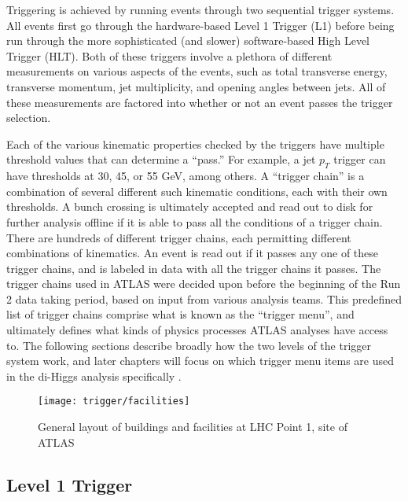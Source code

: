     Triggering is achieved by running events through two sequential trigger systems.
    All events first go through the hardware-based Level 1 Trigger (L1) before being run through the more sophisticated (and slower) software-based High Level Trigger (HLT).
    Both of these triggers involve a plethora of different measurements on various aspects of the events, such as total transverse energy, transverse momentum, jet multiplicity, and opening angles between jets.
    All of these measurements are factored into whether or not an event passes the trigger selection.

    Each of the various kinematic properties checked by the triggers have multiple threshold values that can determine a ``pass.''
    For example, a jet $p_T$ trigger can have thresholds at 30, 45, or 55 GeV, among others.
    A ``trigger chain'' is a combination of several different such kinematic conditions, each with their own thresholds.
    A bunch crossing is ultimately accepted and read out to disk for further analysis offline if it is able to pass all the conditions of a trigger chain.
    There are hundreds of different trigger chains, each permitting different combinations of kinematics.
    An event is read out if it passes any one of these trigger chains, and is labeled in data with all the trigger chains it passes.
    The trigger chains used in ATLAS were decided upon before the beginning of the Run 2 data taking period, based on input from various analysis teams.
    This predefined list of trigger chains comprise what is known as the ``trigger menu'', and ultimately defines what kinds of physics processes ATLAS analyses have access to.
    The following sections describe broadly how the two levels of the trigger system work, and later chapters will focus on which trigger menu items are used in the di-Higgs analysis specifically .

    \begin{figure}[h]
        \texttt{[image: trigger/facilities]}
        \caption{General layout of buildings and facilities at LHC Point 1, site of ATLAS \cite{trigger_tdr}}
        \label{fig:facilities}
    \end{figure}


    \subsection{Level 1 Trigger}\label{sec:L1}

